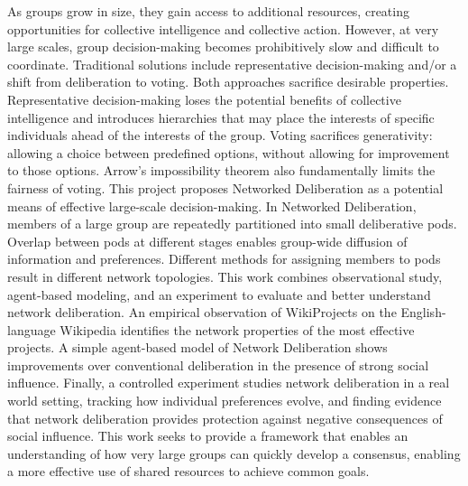 As groups grow in size, they gain access to additional resources, creating opportunities for collective intelligence and collective action.
However, at very large scales, group decision-making becomes prohibitively slow and difficult to coordinate.
Traditional solutions include representative decision-making and/or a shift from deliberation to voting.
Both approaches sacrifice desirable properties.
Representative decision-making loses the potential benefits of collective intelligence and introduces hierarchies that may place the interests of specific individuals ahead of the interests of the group.
Voting sacrifices generativity: allowing a choice between predefined options, without allowing for improvement to those options.
Arrow’s impossibility theorem also fundamentally limits the fairness of voting.
This project proposes Networked Deliberation as a potential means of effective large-scale decision-making.
In Networked Deliberation, members of a large group are repeatedly partitioned into small deliberative pods.
Overlap between pods at different stages enables group-wide diffusion of information and preferences.
Different methods for assigning members to pods result in different network topologies.
This work combines observational study, agent-based modeling, and an experiment to evaluate and better understand network deliberation.
An empirical observation of WikiProjects on the English-language Wikipedia identifies the network properties of the most effective projects.
A simple agent-based model of Network Deliberation shows improvements over conventional deliberation in the presence of strong social influence.
Finally, a controlled experiment studies network deliberation in a real world setting, tracking how individual preferences evolve, and finding evidence that network deliberation provides protection against negative consequences of social influence.
This work seeks to provide a framework that enables an understanding of
how very large groups can quickly develop a consensus, enabling a more effective use of shared resources to achieve common goals.